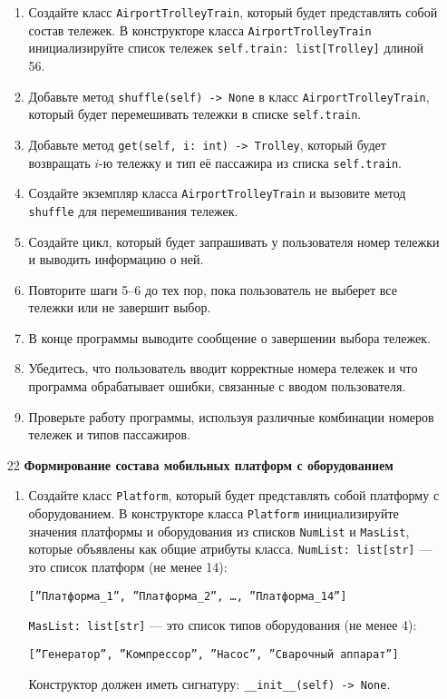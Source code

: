 \begin{enumerate}
\begin{enumerate}
    \item Создайте класс \texttt{AirportTrolleyTrain}, который будет представлять собой состав тележек. В конструкторе класса \texttt{AirportTrolleyTrain} инициализируйте список тележек \texttt{self.train: list[Trolley]} длиной 56.

    \item Добавьте метод \texttt{shuffle(self) -> None} в класс \texttt{AirportTrolleyTrain}, который будет перемешивать тележки в списке \texttt{self.train}.

    \item Добавьте метод \texttt{get(self, i: int) -> Trolley}, который будет возвращать $i$-ю тележку и тип её пассажира из списка \texttt{self.train}.

    \item Создайте экземпляр класса \texttt{AirportTrolleyTrain} и вызовите метод \texttt{shuffle} для перемешивания тележек.

    \item Создайте цикл, который будет запрашивать у пользователя номер тележки и выводить информацию о ней.

    \item Повторите шаги 5–6 до тех пор, пока пользователь не выберет все тележки или не завершит выбор.

    \item В конце программы выводите сообщение о завершении выбора тележек.

    \item Убедитесь, что пользователь вводит корректные номера тележек и что программа обрабатывает ошибки, связанные с вводом пользователя.

    \item Проверьте работу программы, используя различные комбинации номеров тележек и типов пассажиров.
\end{enumerate}

\item[22] \textbf{Формирование состава мобильных платформ с оборудованием}
\begin{enumerate}
    \item Создайте класс \texttt{Platform}, который будет представлять собой платформу с оборудованием. В конструкторе класса \texttt{Platform} инициализируйте значения платформы и оборудования из списков \texttt{NumList} и \texttt{MasList}, которые объявлены как общие атрибуты класса. \texttt{NumList: list[str]} — это список платформ (не менее 14): 
    \begin{center}
        \texttt{[''Платформа\_1'', ''Платформа\_2'', \dots, ''Платформа\_14'']}
    \end{center}
    \texttt{MasList: list[str]} — это список типов оборудования (не менее 4):
    \begin{center}
        \texttt{[''Генератор'', ''Компрессор'', ''Насос'', ''Сварочный аппарат'']}
    \end{center}
    Конструктор должен иметь сигнатуру: \texttt{\_\_init\_\_(self) -> None}.


\end{enumerate}
\end{enumerate}
